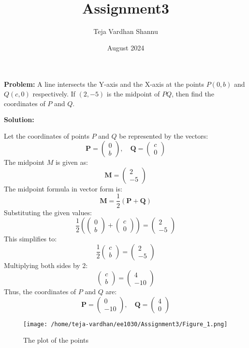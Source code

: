 \documentclass{article}
\title{Assignment3}
\author{Teja Vardhan Shannu}
\date{August 2024}
\begin{document}
\maketitle
\textbf{Problem:} A line intersects the Y-axis and the X-axis at the points $P(0,b)$ and $Q(c,0)$ respectively. If $(2,-5)$ is the midpoint of $PQ$, then find the coordinates of $P$ and $Q$.

\textbf{Solution:}

Let the coordinates of points $P$ and $Q$ be represented by the vectors:
\[
\mathbf{P} = \begin{pmatrix} 0 \\ b \end{pmatrix}, \quad \mathbf{Q} = \begin{pmatrix} c \\ 0 \end{pmatrix}
\]
The midpoint $M$ is given as:
\[
\mathbf{M} = \begin{pmatrix} 2 \\ -5 \end{pmatrix}
\]
The midpoint formula in vector form is:
\[
\mathbf{M} = \frac{1}{2} (\mathbf{P} + \mathbf{Q})
\]
Substituting the given values:
\[
\frac{1}{2} \left(\begin{pmatrix} 0 \\ b \end{pmatrix} + \begin{pmatrix} c \\ 0 \end{pmatrix}\right) = \begin{pmatrix} 2 \\ -5 \end{pmatrix}
\]
This simplifies to:
\[
\frac{1}{2} \begin{pmatrix} c \\ b \end{pmatrix} = \begin{pmatrix} 2 \\ -5 \end{pmatrix}
\]
Multiplying both sides by 2:
\[
\begin{pmatrix} c \\ b \end{pmatrix} = \begin{pmatrix} 4 \\ -10 \end{pmatrix}
\]
Thus, the coordinates of $P$ and $Q$ are:
\[
\mathbf{P} = \begin{pmatrix} 0 \\ -10 \end{pmatrix}, \quad \mathbf{Q} = \begin{pmatrix} 4 \\ 0 \end{pmatrix}
\]

\begin{figure}[h!]
  \hspace{-5cm}
  \texttt{[image: /home/teja-vardhan/ee1030/Assignment3/Figure\_1.png]}
  
  \caption{The plot of the points }
  \label{fig:your_label}
\end{figure}
\end{document}
